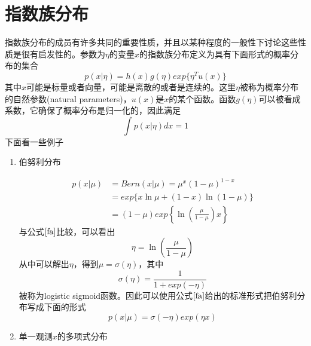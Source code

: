 \section{指数族分布}
指数族分布的成员有许多共同的重要性质，并且以某种程度的一般性下讨论这些性质是很有启发性的。参数为$\eta$的变量$x$的指数族分布定义为具有下面形式的概率分布的集合
\begin{equation}
\label{fa}
	p(x|\eta)=h(x)g(\eta)exp\{\eta^Tu(x)\}
\end{equation}
其中$x$可能是标量或者向量，可能是离散的或者是连续的。这里$\eta$被称为概率分布的自然参数(natural parameters)，$u(x)$是$x$的某个函数。函数$g(\eta)$可以被看成系数，它确保了概率分布是归一化的，因此满足
\begin{equation}
	\int p(x|\eta)dx =1
\end{equation}
下面看一些例子
\begin{enumerate}
	\item 伯努利分布
	
	\begin{equation}
		\begin{aligned}
			p(x|\mu)&=Bern(x|\mu)=\mu^x(1-\mu)^{1-x}\\
			&=exp\{x\ln \mu +(1-x)\ln (1-\mu) \}\\
			&=(1-\mu)exp\left\{\ln\left(\frac{\mu}{1-\mu} \right)x \right\}
		\end{aligned}
	\end{equation}
	与公式$\ref{fa}$比较，可以看出
	\begin{equation}
		\eta=\ln \left(\frac{\mu}{1-\mu}\right)
	\end{equation}
	从中可以解出$\eta$，得到$\mu=\sigma(\eta)$，其中
	\begin{equation}
		\sigma(\eta)=\frac{1}{1+exp(-\eta)}
	\end{equation}
	被称为logistic sigmoid函数。因此可以使用公式$\ref{fa}$给出的标准形式把伯努利分布写成下面的形式
	\begin{equation}
		p(x|\mu)=\sigma(-\eta)exp(\eta x)
	\end{equation}
	\item 单一观测$x$的多项式分布
	

\end{enumerate}
